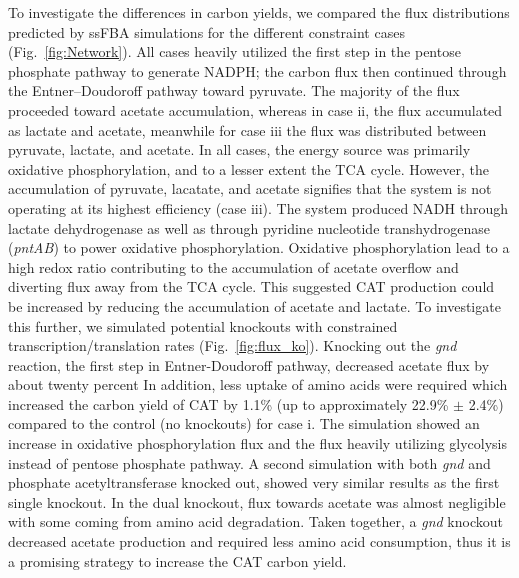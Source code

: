 \documentclass[12pt]{article}
\begin{document}
To investigate the differences in carbon yields, we compared the flux distributions predicted by ssFBA simulations for the different constraint cases  (Fig.~\ref{fig:Network}).
All cases heavily utilized the first step in the pentose phosphate pathway to generate NADPH;
the carbon flux then continued through the Entner–Doudoroff pathway toward pyruvate.
The majority of the flux proceeded toward acetate accumulation, whereas in case ii, the flux accumulated as lactate and acetate, meanwhile for case iii the flux was distributed between pyruvate, lactate, and acetate.
In all cases, the energy source was primarily oxidative phosphorylation, and to a lesser extent the TCA cycle.
However, the accumulation of pyruvate, lacatate, and acetate signifies that the system is not operating at its highest efficiency (case iii).
The system produced NADH through lactate dehydrogenase as well as through pyridine nucleotide transhydrogenase (\textit{pntAB}) to power oxidative phosphorylation.
Oxidative phosphorylation lead to a high redox ratio contributing to the accumulation of acetate overflow and diverting flux away from the TCA cycle.
This suggested CAT production could be increased by reducing the accumulation of acetate and lactate.
To investigate this further, we simulated potential knockouts with constrained transcription/translation rates  (Fig.~\ref{fig:flux_ko}).
Knocking out the \textit{gnd} reaction, the first step in Entner-Doudoroff pathway, decreased acetate flux by about twenty percent
In addition, less uptake of amino acids were required which increased the carbon yield of CAT by 1.1\% (up to approximately 22.9\% $\pm$ 2.4\%) compared to the control (no knockouts) for case i.
The simulation showed an increase in oxidative phosphorylation flux and the flux heavily utilizing glycolysis instead of pentose phosphate pathway.
A second simulation with both \textit{gnd} and phosphate acetyltransferase knocked out,
showed very similar results as the first single knockout.
In the dual knockout, flux towards acetate was almost negligible with some coming from amino acid degradation.
Taken together, a \textit{gnd} knockout decreased acetate production and required less amino acid consumption, thus it is a promising strategy to increase the CAT carbon yield.

\end{document}
